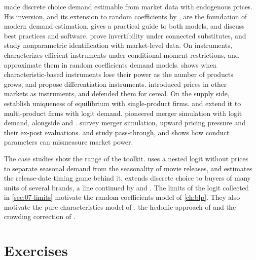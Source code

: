 \citet{Berry1994} made discrete choice demand estimable from market data with endogenous prices. His inversion,
and its extension to random coefficients by \citet{BerryLevinsohnPakes1995}, are the foundation of modern demand
estimation. \citet{Nevo2000a} gives a practical guide to both models, and \citet{ConlonGortmaker2020} discuss best
practices and software. \citet{BerryGandhiHaile2013} prove invertibility under connected substitutes, and
\citet{BerryHaile2014} study nonparametric identification with market-level data. On instruments,
\citet{Chamberlain1987} characterizes efficient instruments under conditional moment restrictions, and
\citet{ReynaertVerboven2014} approximate them in random coefficients demand models. \citet{Armstrong2016} shows
when characteristic-based instruments lose their power as the number of products grows, and \citet{GandhiHoude2019}
propose differentiation instruments.
\citet{HausmanLeonardZona1994} introduced prices in other markets as instruments, and \citet{Nevo2001} defended them
for cereal. On the supply side, \citet{CaplinNalebuff1991} establish uniqueness of equilibrium with single-product
firms. \citet{KonovalovSandor2010} and \citet{NockeSchutz2018} extend it to multi-product firms with logit demand.
\citet{WerdenFroeb1994} pioneered merger simulation with logit demand, alongside \citet{HausmanLeonardZona1994} and
\citet{Nevo2000b}. \citet{AskerNocke2021} survey merger simulation, upward pricing pressure and their ex-post
evaluations. \citet{BulowPfleiderer1983} and \citet{WeylFabinger2013} study pass-through, and \citet{Corts1999}
shows how conduct parameters can mismeasure market power.

The case studies show the range of the toolkit. \citet{Einav2007} uses a nested logit without prices to separate
seasonal demand from the seasonality of movie releases, and \citet{Einav2010} estimates the release-date timing
game behind it. \citet{Hendel1999} extends discrete choice to buyers of many units of several brands, a line
continued by \citet{Dube2004} and \citet{Gentzkow2007}. The limits of the logit collected in \cref{sec:07-limits}
motivate the random coefficients model of \cref{ch:blp}. They also motivate the pure characteristics model of
\citet{BerryPakes2007}, the hedonic approach of \citet{BajariBenkard2005} and the crowding correction of
\citet{AckerbergRysman2005}.

\section{Exercises}\label{sec:07-exercises}

